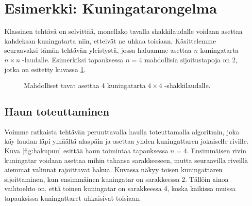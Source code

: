 \section{Esimerkki: Kuningatarongelma}

Klassinen tehtävä on selvittää,
monellako tavalla shakkilaudalle voidaan asettaa kahdeksan kuningatarta
niin, etteivät ne uhkaa toisiaan.
Käsittelemme seuraavaksi tämän tehtävän yleistystä,
jossa haluamme asettaa $n$ kuningatarta $n \times n$ -laudalle.
Esimerkiksi tapauksessa $n=4$ mahdollisia sijoitustapoja on 2,
jotka on esitetty kuvassa \ref{fig:kuning}.


\begin{figure}
\center
{}
\caption{Mahdolliset tavat asettaa 4 kuningatarta $4 \times 4$ -shakkilaudalle.}
\label{fig:kuning}
\end{figure}

\subsection{Haun toteuttaminen}

Voimme ratkaista tehtävän peruuttavalla haulla toteuttamalla algoritmin,
joka käy laudan läpi ylhäältä alaspäin ja asettaa yhden kuningattaren
jokaiselle riville.
Kuva \ref{fig:hakupuu} esittää haun toimintaa tapauksessa $n=4$.
Ensimmäisen rivin kuningatar voidaan asettaa mihin tahansa sarakkeeseen,
mutta seuraavilla riveillä aiemmat valinnat rajoittavat hakua.
Kuvassa näkyy toisen kuningattaren sijoittaminen,
kun ensimmäinen kuningatar on sarakkeessa 2.
Tällöin ainoa vaihtoehto on, että toinen kuningatar on sarakkeessa 4,
koska kaikissa muissa tapauksissa kuningattaret uhkaisivat toisiaan.


